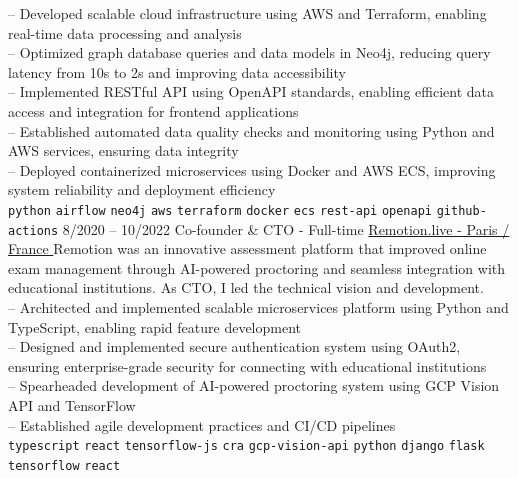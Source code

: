 \begin{entrylist}
{        -- Developed scalable cloud infrastructure using AWS and Terraform, enabling real-time data processing and analysis \\
        -- Optimized graph database queries and data models in Neo4j, reducing query latency from 10s to 2s and improving data accessibility \\
        -- Implemented RESTful API using OpenAPI standards, enabling efficient data access and integration for frontend applications \\
        -- Established automated data quality checks and monitoring using Python and AWS services, ensuring data integrity \\
        -- Deployed containerized microservices using Docker and AWS ECS, improving system reliability and deployment efficiency \\
        \texttt{python}\slashsep
        \texttt{airflow}\slashsep
        \texttt{neo4j}\slashsep
        \texttt{aws}\slashsep
        \texttt{terraform}\slashsep
        \texttt{docker}\slashsep
        \texttt{ecs}\slashsep
        \texttt{rest-api}\slashsep
        \texttt{openapi}\slashsep
        \texttt{github-actions}\slashsep
    }
    \entry
    {8/2020 -- 10/2022}
    {Co-founder \& CTO - Full-time}
    {\href{https://remotion.live/}{Remotion.live - Paris / France }}
    {Remotion was an innovative assessment platform that improved online exam management through AI-powered proctoring and seamless integration with educational institutions. As CTO, I led the technical vision and development.\\
        -- Architected and implemented scalable microservices platform using Python and TypeScript, enabling rapid feature development \\
        -- Designed and implemented secure authentication system using OAuth2, ensuring enterprise-grade security for connecting with educational institutions \\
        -- Spearheaded development of AI-powered proctoring system using GCP Vision API and TensorFlow \\
        -- Established agile development practices and CI/CD pipelines\\
        \texttt{typescript}\slashsep
        \texttt{react}\slashsep
        \texttt{tensorflow-js}\slashsep
        \texttt{cra}\slashsep
        \texttt{gcp-vision-api}\slashsep
        \texttt{python}\slashsep
        \texttt{django}\slashsep
        \texttt{flask}\slashsep
        \texttt{tensorflow}\slashsep
        \texttt{react}\slashsep
}
\end{entrylist}
